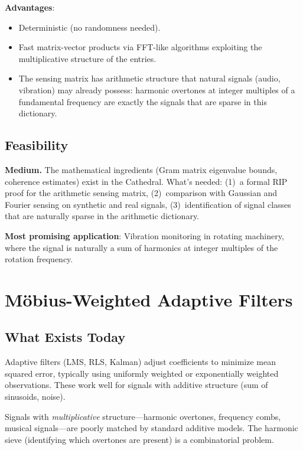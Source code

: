 \documentclass[11pt,a4paper]{article}
\begin{document}
\textbf{Advantages}:
\begin{itemize}
  \item Deterministic (no randomness needed).
  \item Fast matrix-vector products via FFT-like algorithms
    exploiting the multiplicative structure of the entries.
  \item The sensing matrix has arithmetic structure that natural
    signals (audio, vibration) may already possess: harmonic
    overtones at integer multiples of a fundamental frequency are
    exactly the signals that are sparse in this dictionary.
\end{itemize}

\subsection{Feasibility}

\textbf{Medium.} The mathematical ingredients (Gram matrix
eigenvalue bounds, coherence estimates) exist in the Cathedral.
What's needed: (1)~a formal RIP proof for the arithmetic sensing
matrix, (2)~comparison with Gaussian and Fourier sensing on
synthetic and real signals, (3)~identification of signal classes
that are naturally sparse in the arithmetic dictionary.

\textbf{Most promising application}: Vibration monitoring in
rotating machinery, where the signal is naturally a sum of harmonics
at integer multiples of the rotation frequency.

\section{M\"obius-Weighted Adaptive Filters}
\label{sec:filters}

\subsection{What Exists Today}

Adaptive filters (LMS, RLS, Kalman) adjust coefficients to minimize
mean squared error, typically using uniformly weighted or
exponentially weighted observations. These work well for signals
with additive structure (sum of sinusoids, noise).

Signals with \emph{multiplicative} structure---harmonic overtones,
frequency combs, musical signals---are poorly matched by standard
additive models. The harmonic sieve (identifying which overtones
are present) is a combinatorial problem.
\end{document}
